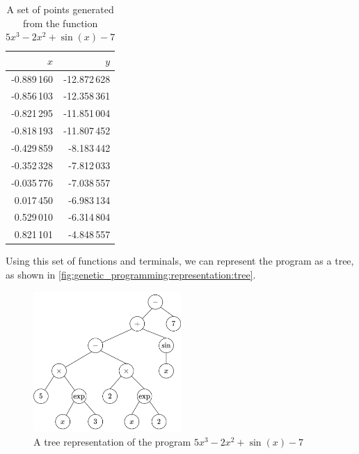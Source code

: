   \begin{table}[ht!]
    \centering
    \begin{tabular}{|r|r|}
      \hline
      \(x\) & \(y\) \\
      \hline
      \hline
      -0.889\,160    & -12.872\,628 \\
      \hline
      -0.856\,103   & -12.358\,361 \\
      \hline
      -0.821\,295   & -11.851\,004 \\
      \hline
      -0.818\,193   & -11.807\,452 \\
      \hline
      -0.429\,859   & -8.183\,442  \\
      \hline
      -0.352\,328   & -7.812\,033  \\
      \hline
      -0.035\,776   & -7.038\,557  \\
      \hline
      0.017\,450  & -6.983\,134  \\
      \hline
      0.529\,010    & -6.314\,804 \\
      \hline
      0.821\,101    & -4.848\,557  \\
      \hline
    \end{tabular}
    \caption{
      A set of points generated from the function \(5x^3 - 2x^2 + \sin(x) - 7\)
    }
    \label{tab:genetic_programming:representation:points}
  \end{table}

  Using this set of functions and terminals, we can represent the program as a
  tree, as shown in \vref{fig:genetic_programming:representation:tree}.

  \begin{figure}[ht!]
    \centering
    \includegraphics[width=0.5\textwidth]{img/theoretical_framework/Expected Expression Tree.png}
    \caption{
      A tree representation of the program \(5x^3 - 2x^2 + \sin(x) - 7\)
    }
    \label{fig:genetic_programming:representation:tree}
  \end{figure}

